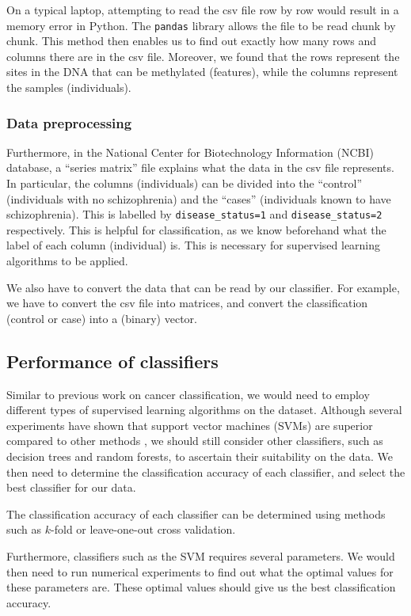 \documentclass[12pt, twoside, a4paper]{article}
\begin{document}
On a typical laptop, attempting to read the csv file row by row would result in a memory error in Python. The \texttt{pandas} library allows the file to be read chunk by chunk. This method then enables us to find out exactly how many rows and columns there are in the csv file. Moreover, we found that the rows represent the sites in the DNA that can be methylated (features), while the columns represent the samples (individuals).

\subsubsection{Data preprocessing}
Furthermore, in the National Center for Biotechnology Information (NCBI) database, a ``series matrix'' file  explains what the data in the csv file represents. In particular, the columns (individuals) can be divided into the ``control'' (individuals with no schizophrenia) and the ``cases'' (individuals known to have schizophrenia). This is labelled by \texttt{disease\_status=1} and \texttt{disease\_status=2} respectively. This is helpful for classification, as we know beforehand what the label of each column (individual) is. This is necessary for supervised learning algorithms to be applied.

We also have to convert the data that can be read by our classifier. For example, we have to convert the csv file into matrices, and convert the classification (control or case) into a (binary) vector.

\subsection{Performance of classifiers}
Similar to previous work on cancer classification, we would need to employ different types of supervised learning algorithms on the dataset. Although several experiments have shown that support vector machines (SVMs) are superior compared to other methods \cite{RefWorks:90}, we should still consider other classifiers, such as decision trees and random forests, to ascertain their suitability on the data. We then need to determine the classification accuracy of each classifier, and select the best classifier for our data.

The classification accuracy of each classifier can be determined using methods such as $k$-fold or leave-one-out cross validation.

Furthermore, classifiers such as the SVM requires several parameters. We would then need to run numerical  experiments to find out what the optimal values for these parameters are. These optimal values should give us the best classification accuracy.
\end{document}
